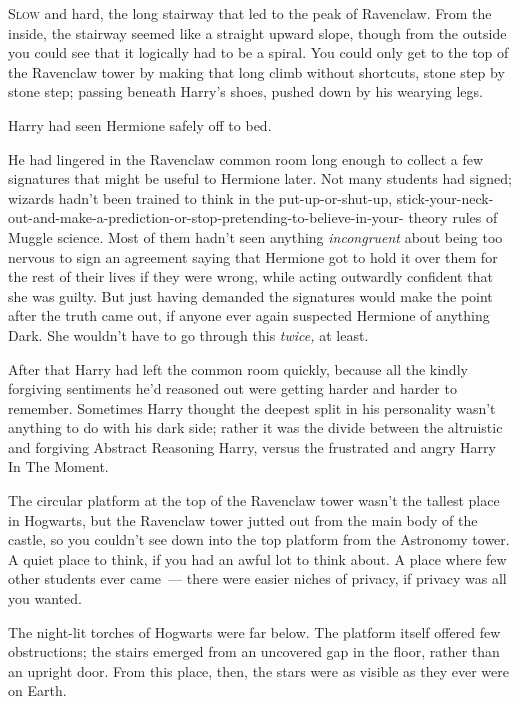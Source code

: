 
\lettrine{S}{low} and hard, the long stairway that led to the peak of Ravenclaw. From the
inside, the stairway seemed like a straight upward slope, though from the
outside you could see that it logically had to be a spiral. You could only get
to the top of the Ravenclaw tower by making that long climb without shortcuts,
stone step by stone step; passing beneath Harry's shoes, pushed down by his
wearying legs.

Harry had seen Hermione safely off to bed.

He had lingered in the Ravenclaw common room long enough to collect a few
signatures that might be useful to Hermione later. Not many students had
signed; wizards hadn't been trained to think in the put-up-or-shut-up,
stick-your-neck-out-and-make-a-prediction-or-stop-pretending-to-believe-in-your-
theory rules of Muggle science. Most of them hadn't seen anything
\emph{incongruent} about being too nervous to sign an agreement saying that
Hermione got to hold it over them for the rest of their lives if they were
wrong, while acting outwardly confident that she was guilty. But just having
demanded the signatures would make the point after the truth came out, if
anyone ever again suspected Hermione of anything Dark. She wouldn't have to go
through this \emph{twice,} at least.

After that Harry had left the common room quickly, because all the kindly
forgiving sentiments he'd reasoned out were getting harder and harder to
remember. Sometimes Harry thought the deepest split in his personality wasn't
anything to do with his dark side; rather it was the divide between the
altruistic and forgiving Abstract Reasoning Harry, versus the frustrated and
angry Harry In The Moment.

The circular platform at the top of the Ravenclaw tower wasn't the tallest
place in Hogwarts, but the Ravenclaw tower jutted out from the main body of the
castle, so you couldn't see down into the top platform from the Astronomy
tower. A quiet place to think, if you had an awful lot to think about. A place
where few other students ever came~--- there were easier niches of privacy, if
privacy was all you wanted.

The night-lit torches of Hogwarts were far below. The platform itself offered
few obstructions; the stairs emerged from an uncovered gap in the floor, rather
than an upright door. From this place, then, the stars were as visible as they
ever were on Earth.


